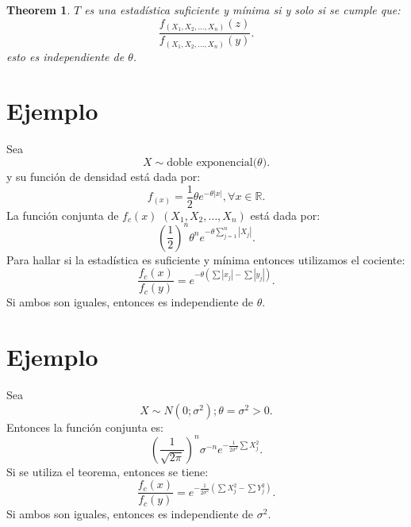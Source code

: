 \documentclass{article}
\newtheorem{mythm}{Theorem}
\begin{document}
\begin{mythm}
$T$ es una estadística suficiente y mínima si y solo si se cumple que:
\[ \frac{f_{(X_{1},X_{2},\ldots,X_{n})}{(z)}}{f_{(X_{1},X_{2},\ldots,X_{n})}{(y)}}.\]
esto es independiente de $\theta$.
\end{mythm}
\section{Ejemplo}
Sea
\[ X\sim \text{doble exponencial($\theta$)}.\]
y su función de densidad está dada por:
\[ f_{{(x)}}=\frac{1}{2}\theta e^{-\theta |x|}, \forall x \in \mathbb{R}.\]
La función conjunta de $f_{c}{(x)}$ $(X_{1},X_{2},\ldots,X_{n})$ está dada por:
\[ {(\frac{1}{2})}^{n}\theta^{n}e^{-\theta \sum_{j=1}^{n} |X_{j}|}.\]
Para hallar si la estadística es suficiente y mínima entonces utilizamos el cociente:
\[ \frac{f_{c}{(x)}}{f_{c}{(y)}}=e^{-\theta{(\sum |x_{j}| - \sum |y_{j}|)}}.\]
Si ambos son iguales, entonces es independiente de $\theta$.

\section{Ejemplo}
Sea
\[ X \sim N(0;\sigma^{2});\theta=\sigma^{2}>0.\]
Entonces la función conjunta es:
\[ {(\frac{1}{\sqrt{2\pi}})}^{n}\sigma^{-n}e^{-\frac{1}{2\sigma^{2}}\sum X_{j}^{2}}.\]
Si se utiliza el teorema, entonces se tiene:
\[ \frac{f_{c}{(x)}}{f_{c}{(y)}}=e^{-\frac{1}{2\sigma^{2}}{(\sum X_{j}^{2}-\sum Y_{j}^{2})}}.\]
Si ambos son iguales, entonces es independiente de $\sigma^{2}$.
\end{document}
